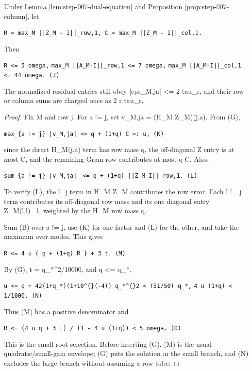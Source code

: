 \begin{proposition}\label{prop:step-007-row}

Under Lemma [lem:step-007-dual-equation] and Proposition
[prop:step-007-column], let

\texttt{R = max\_M ||Z\_M - I||\_row,1,    C = max\_M ||Z\_M - I||\_col,1.}

Then

\texttt{R <= 5 omega,}
\texttt{max\_M ||A\_M-I||\_row,1 <= 7 omega,}
\texttt{max\_M ||A\_M-I||\_col,1 <= 44 omega.                            (J)}

The normalized residual entries still obey |eps\_M,ja| <= 2 tau\_r, and
their row or column sums are charged once as 2 r tau\_r.

\begin{proof}

Fix M and row j.  For a != j, set v\_M,ja = (H\_M Z\_M)(j,a).  From (G),

\texttt{max\_\{a != j\} |v\_M,ja| <= q + (1+q) C =: u,                   (K)}

since the direct H\_M(j,a) term has row mass q, the off-diagonal Z entry is
at most C, and the remaining Gram row contributes at most q C.  Also,

\texttt{sum\_\{a != j\} |v\_M,ja|}
\texttt{  <= q + (1+q) ||Z\_M-I||\_row,1.                              (L)}

To verify (L), the l=j term in H\_M Z\_M contributes the row error.  Each
l != j term contributes its off-diagonal row mass and its one diagonal
entry Z\_M(l,l)=1, weighted by the H\_M row mass q.

Sum (B) over a != j, use (K) for one factor and (L) for the other, and
take the maximum over modes.  This gives

\texttt{R <= 4 u \{ q + (1+q) R \} + 3 t.                              (M)}

By (G), t = q\_*\textasciicircum{}2/10000, and q <= q\_*,

\texttt{u <= q + 42(1+q\_*)(1+10\textasciicircum\{\}(-4)) q\_*\textasciicircum\{\}2 < (51/50) q\_*,}
\texttt{4 u (1+q) < 1/1000.                                         (N)}

Thus (M) has a positive denominator and

\texttt{R <= (4 u q + 3 t) / (1 - 4 u (1+q)) < 5 omega.               (O)}

This is the small-root selection.  Before inserting (G), (M) is the usual
quadratic/small-gain envelope; (G) puts the solution in the small branch,
and (N) excludes the large branch without assuming a row tube.


\end{proof}
\end{proposition}
